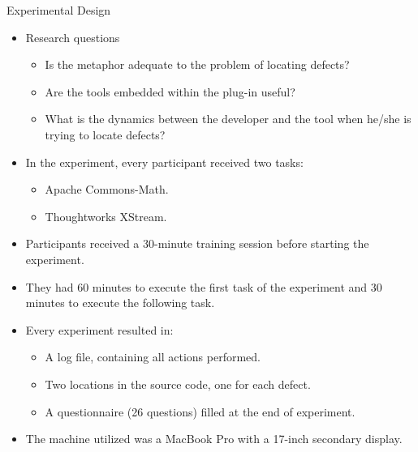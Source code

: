 \documentclass[handout]{beamer}
\begin{document}
\begin{frame}[allowframebreaks]{Experimental Design}
    \begin{itemize}
        \item Research questions
            \begin{itemize}
                \item Is the metaphor adequate to the problem of locating
                defects?
                \item Are the tools embedded within the plug-in useful?
                \item What is the dynamics between the developer and the
                tool when he/she is trying to locate defects?
            \end{itemize}
        \item In the experiment, every participant received two tasks:
            \begin{itemize}
                \item Apache Commons-Math.
                \item Thoughtworks XStream.
            \end{itemize}
        \framebreak
        \item Participants received a 30-minute training session before starting
        the experiment.
        \item They had 60 minutes to execute the first task of the experiment
        and 30 minutes to execute the following task.
        \item Every experiment resulted in:
        \begin{itemize}
            \item A log file, containing all actions performed.
            \item Two locations in the source code, one for each defect.
            \item A questionnaire (26 questions) filled at the end of
            experiment.
        \end{itemize}
        \item The machine utilized was a MacBook Pro with a 17-inch secondary
        display.
    \end{itemize}
\end{frame}
\end{document}
